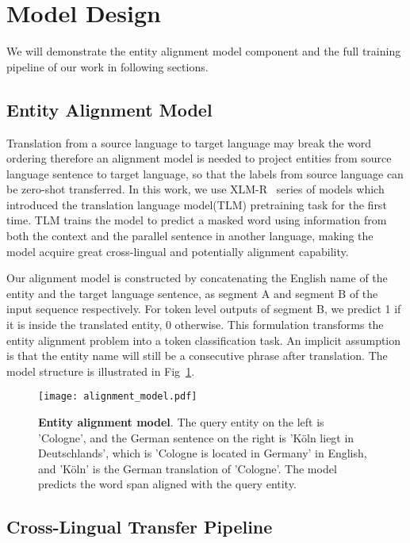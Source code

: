 \documentclass[11pt]{article}
\begin{document}
\section{Model Design}
\label{section:model}
We will demonstrate the entity alignment model component and the full training pipeline of our work in following sections.

\subsection{Entity Alignment Model}

Translation from a source language to target language may break the word ordering therefore an alignment model is needed to project entities from source language sentence to target language, so that the labels from source language can be zero-shot transferred. In this work, we use XLM-R~\cite{lample2019cross, Conneau2020} series of models which introduced the translation language model(TLM) pretraining task for the first time. TLM trains the model to predict a masked word using information from both the context and the parallel sentence in another language, making the model acquire great cross-lingual and potentially alignment capability.

Our alignment model is constructed by concatenating the English name of the entity and the target language sentence, as segment A and segment B of the input sequence respectively. For token level outputs of segment B, we predict 1 if it is inside the translated entity, 0 otherwise. This formulation transforms the entity alignment problem into a token classification task. An implicit assumption is that the entity name will still be a consecutive phrase after translation. The model structure is illustrated in Fig~\ref{fig:alignmentNetwork}.

\begin{figure}[!h]
	\centering
	\texttt{[image: alignment\_model.pdf]}
	\caption{\textbf{Entity alignment model}. The query entity on the left is 'Cologne', and the German sentence on the right is 'Köln liegt in Deutschlands', which is 'Cologne is located in Germany' in English, and 'Köln' is the German translation of 'Cologne'. The model predicts the word span aligned with the query entity.}
	\label{fig:alignmentNetwork}
\end{figure}


\subsection{Cross-Lingual Transfer Pipeline}
\end{document}
